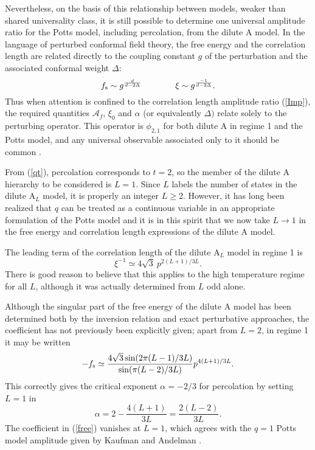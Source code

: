 \documentclass[a4paper,a4paper]{article}
\begin{document}
Nevertheless, on the basis of this relationship between models,
weaker than shared
universality class, it is still possible to determine one
universal amplitude ratio for the Potts model, including 
percolation, from the dilute
A model. 
In the language of perturbed conformal field theory, the free energy and 
the correlation
length are related directly to the coupling constant $g$ of the perturbation 
and the
associated conformal weight $\Delta$:
\begin{equation*}
f_{\rm s} \sim  g^{\frac{d}{d-2\Delta}} \qquad \qquad
\xi    \sim  g^{\frac{-1}{d-2\Delta}}.
\end{equation*}
Thus when attention is confined to the correlation length amplitude ratio 
(\ref{Imp}),
the required quantities $\mathcal{A}_{f}$, $\xi_0$ and $\alpha$ (or 
equivalently $\Delta)$
relate solely to the perturbing operator. This operator is $\phi_{2,1}$
for both  dilute A in regime 1 and the Potts model, and any universal 
observable associated only
to it should be common \cite{delf2}.



From (\ref{qt}), percolation corresponds to $t=2$, so the member of
the dilute A hierarchy to be considered is $L=1$.
Since $L$ labels the number of states in the dilute A$_L$ model, 
it is properly an integer $L\geqslant 2$.
However, it has long been realized that $q$ can
be treated as a continuous variable in an appropriate
formulation of the Potts model \cite{FK} and it is in this spirit
that we now take $L \to 1$ in the free energy and correlation length
expressions of the dilute A model. 


The leading term of the correlation length \cite{BS, BS2} of the dilute A$_L$
model in regime 1 is
\begin{equation*}
\xi^{-1}\simeq 4 \sqrt{3}\  p^{2(L+1)/3L}. 
\end{equation*}
There is good reason to believe that this 
applies to the high temperature regime for all $L$, although it
was actually determined from $L$ odd alone.
%

Although the singular part of the free energy of the dilute A model has
been determined both by the inversion relation \cite{WPSN}
and exact perturbative \cite{BS,BS2} approaches, the coefficient
has not previously been explicitly given; apart from $L=2$, in regime 1
it may be written
\begin{equation}
-f_{\rm s}\simeq\frac{4 \sqrt{3} \sin(2 \pi(L-1)/3L)}{\sin(\pi(L-2)/3L)}
p^{4(L+1)/3L}.
\label{free}
\end{equation}
This correctly gives the critical exponent $\alpha=-2/3$ for percolation
by setting $L=1$ in
\begin{equation*}
\alpha= 2-\frac{4(L+1)}{3L}=\frac{2(L-2)}{3L}. \label{alf}
\end{equation*}
The coefficient in (\ref{free}) vanishes at $L=1$, which agrees
with the $q=1$ Potts model amplitude given by Kaufman and Andelman \cite{KA}.
 
\end{document}
